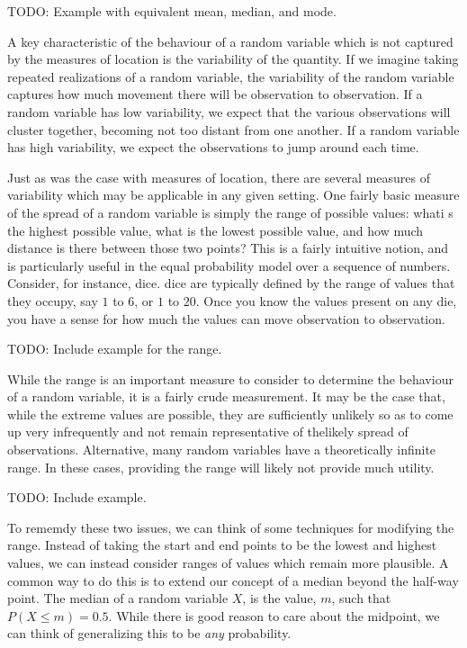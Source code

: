 \documentclass[
  letterpaper,
  DIV=11,
  numbers=noendperiod]{scrreprt}
\begin{document}
TODO: Example with equivalent mean, median, and mode.

A key characteristic of the behaviour of a random variable which is not
captured by the measures of location is the variability of the quantity.
If we imagine taking repeated realizations of a random variable, the
variability of the random variable captures how much movement there will
be observation to observation. If a random variable has low variability,
we expect that the various observations will cluster together, becoming
not too distant from one another. If a random variable has high
variability, we expect the observations to jump around each time.

Just as was the case with measures of location, there are several
measures of variability which may be applicable in any given setting.
One fairly basic measure of the spread of a random variable is simply
the range of possible values: whati s the highest possible value, what
is the lowest possible value, and how much distance is there between
those two points? This is a fairly intuitive notion, and is particularly
useful in the equal probability model over a sequence of numbers.
Consider, for instance, dice. dice are typically defined by the range of
values that they occupy, say \(1\) to \(6\), or \(1\) to \(20\). Once
you know the values present on any die, you have a sense for how much
the values can move observation to observation.

TODO: Include example for the range.

While the range is an important measure to consider to determine the
behaviour of a random variable, it is a fairly crude measurement. It may
be the case that, while the extreme values are possible, they are
sufficiently unlikely so as to come up very infrequently and not remain
representative of thelikely spread of observations. Alternative, many
random variables have a theoretically infinite range. In these cases,
providing the range will likely not provide much utility.

TODO: Include example.

To rememdy these two issues, we can think of some techniques for
modifying the range. Instead of taking the start and end points to be
the lowest and highest values, we can instead consider ranges of values
which remain more plausible. A common way to do this is to extend our
concept of a median beyond the half-way point. The median of a random
variable \(X\), is the value, \(m\), such that \(P(X \leq m) = 0.5\).
While there is good reason to care about the midpoint, we can think of
generalizing this to be \emph{any} probability.
\end{document}
